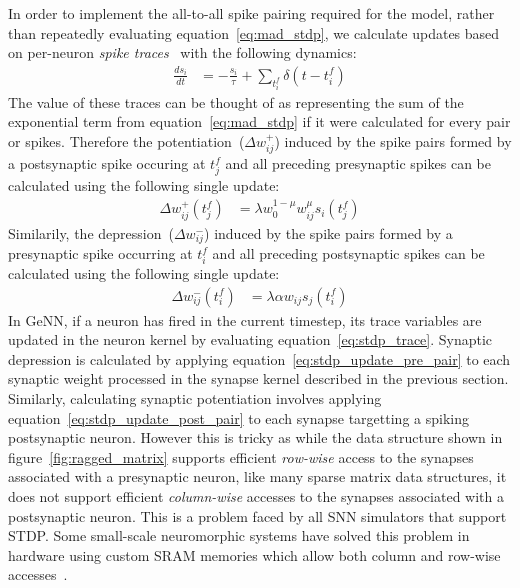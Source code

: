 \documentclass[utf8]{frontiersSCNS} %
\begin{document}
In order to implement the all-to-all spike pairing required for the model, rather than repeatedly evaluating equation~\ref{eq:mad_stdp}, we calculate updates based on per-neuron \textit{spike traces}~\citep{Song2000, Morrison2007} with the following dynamics:
%
\begin{align}
    \frac{ds_{i}}{dt} & = -\frac{s_{i}}{\tau} + \sum_{t_{i}^{f}}\delta(t - t_{i}^{f}) \label{eq:stdp_trace}
\end{align}
%
The value of these traces can be thought of as representing the sum of the exponential term from equation~\ref{eq:mad_stdp} if it were calculated for every pair or spikes.
Therefore the potentiation~($\Delta w_{ij}^{+}$) induced by the spike pairs formed by a postsynaptic spike occuring at $t_{j}^{f}$ and all preceding presynaptic spikes can be calculated using the following single update:
%
\begin{align}
  \Delta w_{ij}^{+}(t_{j}^{f}) & = \lambda w_{0}^{1-\mu} w_{ij}^{\mu} s_{i}(t_{j}^{f})\label{eq:stdp_update_post_pair}
\end{align}
%
Similarily, the depression~($\Delta w_{ij}^{-}$) induced by the spike pairs formed by a presynaptic spike occurring at $t_{i}^{f}$ and all preceding postsynaptic spikes can be calculated using the following single update:
\begin{align}
    \Delta w_{ij}^{-}(t_{i}^{f}) & = \lambda \alpha w_{ij} s_{j}(t_{i}^{f})\label{eq:stdp_update_pre_pair}
\end{align}
%
In GeNN, if a neuron has fired in the current timestep, its trace variables are updated in the neuron kernel by evaluating equation~\ref{eq:stdp_trace}.
Synaptic depression is calculated by applying equation~\ref{eq:stdp_update_pre_pair} to each synaptic weight processed in the synapse kernel described in the previous section.
Similarly, calculating synaptic potentiation involves applying equation~\ref{eq:stdp_update_post_pair} to each synapse targetting a spiking postsynaptic neuron.
However this is tricky as while the data structure shown in figure~\ref{fig:ragged_matrix} supports efficient \textit{row-wise} access to the synapses associated with a presynaptic neuron, like many sparse matrix data structures, it does not support efficient \textit{column-wise} accesses to the synapses associated with a postsynaptic neuron.
This is a problem faced by all SNN simulators that support STDP.
Some small-scale neuromorphic systems have solved this problem in hardware using custom SRAM memories which allow both column and row-wise accesses~\citep{Seo2011}.
\end{document}
